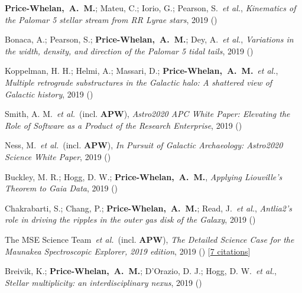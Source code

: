 \item[{\color{deemph}\scriptsize12}]\textbf{Price-Whelan,~A.~M.}; Mateu, C.; Iorio, G.; Pearson, S.~\textit{et al.}, \textit{Kinematics of the Palomar 5 stellar stream from RR Lyrae stars}, 2019 ()

\item[{\color{deemph}\scriptsize11}]Bonaca, A.; Pearson, S.; \textbf{Price-Whelan,~A.~M.}; Dey, A.~\textit{et al.}, \textit{Variations in the width, density, and direction of the Palomar 5 tidal tails}, 2019 ()

\item[{\color{deemph}\scriptsize10}]Koppelman, H. H.; Helmi, A.; Massari, D.; \textbf{Price-Whelan,~A.~M.}~\textit{et al.}, \textit{Multiple retrograde substructures in the Galactic halo: A shattered view of Galactic history}, 2019 ()

\item[{\color{deemph}\scriptsize9}]Smith, A. M.~\textit{et al.}~(incl. \textbf{APW}), \textit{Astro2020 APC White Paper: Elevating the Role of Software as a Product of the Research Enterprise}, 2019 ()

\item[{\color{deemph}\scriptsize8}]Ness, M.~\textit{et al.}~(incl. \textbf{APW}), \textit{In Pursuit of Galactic Archaeology: Astro2020 Science White Paper}, 2019 ()

\item[{\color{deemph}\scriptsize7}]Buckley, M. R.; Hogg, D. W.; \textbf{Price-Whelan,~A.~M.}, \textit{Applying Liouville's Theorem to Gaia Data}, 2019 ()

\item[{\color{deemph}\scriptsize6}]Chakrabarti, S.; Chang, P.; \textbf{Price-Whelan,~A.~M.}; Read, J.~\textit{et al.}, \textit{Antlia2's role in driving the ripples in the outer gas disk of the Galaxy}, 2019 ()

\item[{\color{deemph}\scriptsize5}]The MSE Science Team~\textit{et al.}~(incl. \textbf{APW}), \textit{The Detailed Science Case for the Maunakea Spectroscopic Explorer, 2019 edition}, 2019 () [\href{http://adsabs.harvard.edu/abs/2019arXiv190404907T}{7 citations}]

\item[{\color{deemph}\scriptsize4}]Breivik, K.; \textbf{Price-Whelan,~A.~M.}; D'Orazio, D. J.; Hogg, D. W.~\textit{et al.}, \textit{Stellar multiplicity: an interdisciplinary nexus}, 2019 ()


